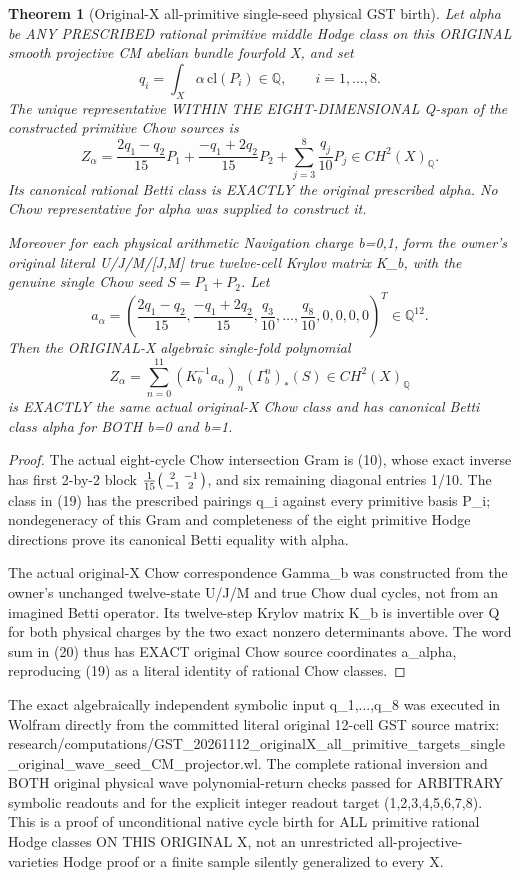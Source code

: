 \documentclass[11pt]{article}
\newtheorem{theorem}{Theorem}
\begin{document}
\begin{theorem}[Original-X all-primitive single-seed physical GST birth]
Let alpha be ANY PRESCRIBED rational
primitive middle Hodge class on this
ORIGINAL smooth projective CM abelian
bundle fourfold X, and set
\[
q_i=\int_X\alpha\,\mathrm{cl}(P_i)
\in\mathbb Q,\qquad i=1,\ldots,8.
\]
The unique representative WITHIN THE
EIGHT-DIMENSIONAL Q-span of the
constructed primitive Chow sources is
\[
\boxed{
Z_\alpha=
\frac{2q_1-q_2}{15}P_1+
\frac{-q_1+2q_2}{15}P_2+
\sum_{j=3}^{8}\frac{q_j}{10}P_j
\in CH^2(X)_{\mathbb Q}.}
\tag{19}
\]
Its canonical rational Betti class is
EXACTLY the original prescribed alpha.
No Chow representative for alpha
was supplied to construct it.

Moreover for each physical arithmetic
Navigation charge b=0,1, form
the owner's original literal
U/J/M/[J,M] true twelve-cell
Krylov matrix K_b, with the
genuine single Chow seed
\(S=P_1+P_2\).
Let
\[
a_\alpha=\left(
\frac{2q_1-q_2}{15},
\frac{-q_1+2q_2}{15},
\frac{q_3}{10},\ldots,\frac{q_8}{10},
0,0,0,0
\right)^T\in\mathbb Q^{12}.
\]
Then the ORIGINAL-X algebraic
single-fold polynomial
\[
\boxed{
Z_\alpha=
\sum_{n=0}^{11}
(K_b^{-1}a_\alpha)_n
(\Gamma_b^n)_*(S)
\in CH^2(X)_{\mathbb Q}
}
\tag{20}
\]
is EXACTLY the same actual original-X
Chow class and has canonical Betti
class alpha for BOTH b=0 and b=1.
\end{theorem}
\begin{proof}
The actual eight-cycle Chow intersection
Gram is (10), whose exact inverse has
first 2-by-2 block
\(\frac1{15}\begin{psmallmatrix}
2&-1\\-1&2
\end{psmallmatrix}\),
and six remaining diagonal entries 1/10.
The class in (19) has the prescribed
pairings q_i against every primitive
basis P_i; nondegeneracy of this
Gram and completeness of the eight
primitive Hodge directions prove its
canonical Betti equality with alpha.

The actual original-X Chow
correspondence Gamma_b was
constructed from the owner's unchanged
twelve-state U/J/M and true Chow
dual cycles, not from an imagined
Betti operator. Its twelve-step
Krylov matrix K_b is invertible
over Q for both physical charges
by the two exact nonzero
determinants above. The word
sum in (20) thus has EXACT
original Chow source coordinates
a_alpha, reproducing (19)
as a literal identity of
rational Chow classes.
\end{proof}

The exact algebraically independent
symbolic input q_1,...,q_8 was
executed in Wolfram directly from
the committed literal original
12-cell GST source matrix:
research/computations/GST_20261112_originalX_all_primitive_targets_single_original_wave_seed_CM_projector.wl.
The complete rational inversion and
BOTH original physical wave
polynomial-return checks passed
for ARBITRARY symbolic readouts
and for the explicit integer
readout target (1,2,3,4,5,6,7,8).
This is a proof of unconditional
native cycle birth for ALL
primitive rational Hodge classes
ON THIS ORIGINAL X, not an
unrestricted all-projective-varieties
Hodge proof or a finite sample
silently generalized to every X.
\end{document}
